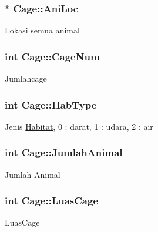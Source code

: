 \subsubsection[{\texorpdfstring{Ani\+Loc}{AniLoc}}]{$\ast$ Cage\+::\+Ani\+Loc\hspace{0.3cm}{\ttfamily [protected]}}\hypertarget{class_cage_acf5ff40bfeaf9b5b34b2d8e3d856f3e9}{}\label{class_cage_acf5ff40bfeaf9b5b34b2d8e3d856f3e9}
Lokasi semua animal 
\subsubsection[{\texorpdfstring{Cage\+Num}{CageNum}}]{\setlength{\rightskip}{0pt plus 5cm}int Cage\+::\+Cage\+Num\hspace{0.3cm}{\ttfamily [protected]}}\hypertarget{class_cage_ac5a1653970d687b3c6070580c203a88e}{}\label{class_cage_ac5a1653970d687b3c6070580c203a88e}
Jumlahcage 
\subsubsection[{\texorpdfstring{Hab\+Type}{HabType}}]{\setlength{\rightskip}{0pt plus 5cm}int Cage\+::\+Hab\+Type\hspace{0.3cm}{\ttfamily [protected]}}\hypertarget{class_cage_a84ab0098eebdb6ce6d00a64533eb963c}{}\label{class_cage_a84ab0098eebdb6ce6d00a64533eb963c}
Jenis \hyperlink{class_habitat}{Habitat}, 0 \+: darat, 1 \+: udara, 2 \+: air 
\subsubsection[{\texorpdfstring{Jumlah\+Animal}{JumlahAnimal}}]{\setlength{\rightskip}{0pt plus 5cm}int Cage\+::\+Jumlah\+Animal\hspace{0.3cm}{\ttfamily [protected]}}\hypertarget{class_cage_a4e04166edf60c708910a7b1c6d81bf3a}{}\label{class_cage_a4e04166edf60c708910a7b1c6d81bf3a}
Jumlah \hyperlink{class_animal}{Animal} 
\subsubsection[{\texorpdfstring{Luas\+Cage}{LuasCage}}]{\setlength{\rightskip}{0pt plus 5cm}int Cage\+::\+Luas\+Cage\hspace{0.3cm}{\ttfamily [protected]}}\hypertarget{class_cage_a5a1aeb70e196f3d5c7539b8277cd89c6}{}\label{class_cage_a5a1aeb70e196f3d5c7539b8277cd89c6}
Luas\+Cage 
